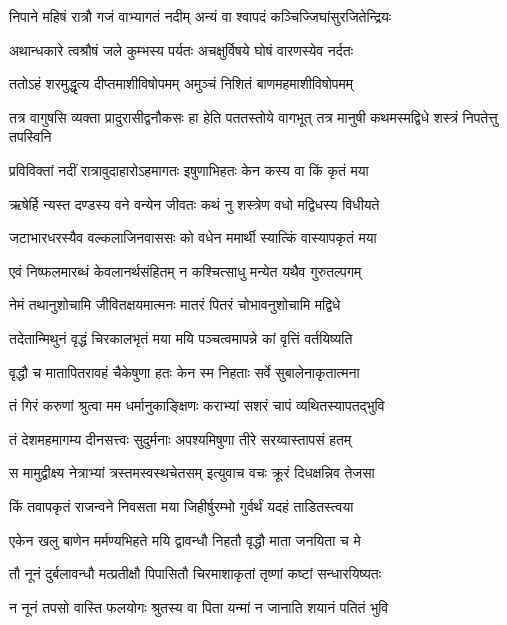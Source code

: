 \twolineshloka
{निपाने महिषं रात्रौ गजं वाभ्यागतं नदीम्}
{अन्यं वा श्वापदं कञ्चिज्जिघांसुरजितेन्द्रियः} %

\twolineshloka
{अथान्धकारे त्वश्रौषं जले कुम्भस्य पर्यतः}
{अचक्षुर्विषये घोषं वारणस्येव नर्दतः} %

\twolineshloka
{ततोऽहं शरमुद्धृत्य दीप्तमाशीविषोपमम्}
{अमुञ्चं निशितं बाणमहमाशीविषोपमम्} %

\threelineshloka
{तत्र वागुषसि व्यक्ता प्रादुरासीद्वनौकसः}
{हा हेति पततस्तोये वागभूत् तत्र मानुषी}
{कथमस्मद्विधे शस्त्रं निपतेत्तु तपस्विनि} %

\twolineshloka
{प्रविविक्तां नदीं रात्रावुदाहारोऽहमागतः}
{इषुणाभिहतः केन कस्य वा किं कृतं मया} %

\twolineshloka
{ऋषेर्हि न्यस्त दण्डस्य वने वन्येन जीवतः}
{कथं नु शस्त्रेण वधो मद्विधस्य विधीयते} %

\twolineshloka
{जटाभारधरस्यैव वल्कलाजिनवाससः}
{को वधेन ममार्थी स्यात्किं वास्यापकृतं मया} %

\twolineshloka
{एवं निष्फलमारब्धं केवलानर्थसंहितम्}
{न कश्चित्साधु मन्येत यथैव गुरुतल्पगम्} %

\twolineshloka
{नेमं तथानुशोचामि जीवितक्षयमात्मनः}
{मातरं पितरं चोभावनुशोचामि मद्विधे} %

\twolineshloka
{तदेतान्मिथुनं वृद्धं चिरकालभृतं मया}
{मयि पञ्चत्वमापन्ने कां वृत्तिं वर्तयिष्यति} %

\twolineshloka
{वृद्धौ च मातापितरावहं चैकेषुणा हतः}
{केन स्म निहताः सर्वे सुबालेनाकृतात्मना} %

\twolineshloka
{तं गिरं करुणां श्रुत्वा मम धर्मानुकाङ्क्षिणः}
{कराभ्यां सशरं चापं व्यथितस्यापतद्भुवि} %

\twolineshloka
{तं देशमहमागम्य दीनसत्त्वः सुदुर्मनाः}
{अपश्यमिषुणा तीरे सरय्वास्तापसं हतम्} %

\twolineshloka
{स मामुद्वीक्ष्य नेत्राभ्यां त्रस्तमस्वस्थचेतसम्}
{इत्युवाच वचः क्रूरं दिधक्षन्निव तेजसा} %

\twolineshloka
{किं तवापकृतं राजन्वने निवसता मया}
{जिहीर्षुरम्भो गुर्वर्थं यदहं ताडितस्त्वया} %

\twolineshloka
{एकेन खलु बाणेन मर्मण्यभिहते मयि}
{द्वावन्धौ निहतौ वृद्धौ माता जनयिता च मे} %

\twolineshloka
{तौ नूनं दुर्बलावन्धौ मत्प्रतीक्षौ पिपासितौ}
{चिरमाशाकृतां तृष्णां कष्टां सन्धारयिष्यतः} %

\twolineshloka
{न नूनं तपसो वास्ति फलयोगः श्रुतस्य वा}
{पिता यन्मां न जानाति शयानं पतितं भुवि} %

